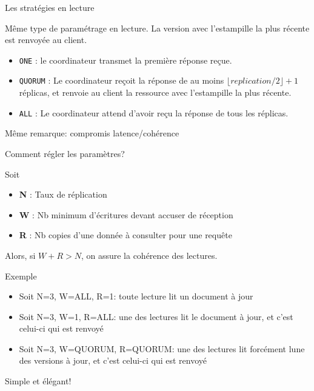  
\begin{frame}[fragile]{Les stratégies en lecture}

Même type de paramétrage en lecture. La version avec l'estampille la plus récente est renvoyée au client.

\begin{itemize}
    \item \texttt{ONE} : le coordinateur transmet la première réponse reçue.

    \item \texttt{QUORUM} : Le coordinateur reçoit la réponse de au moins $\lfloor replication/2 \rfloor +1$  
       réplicas, et renvoie au client la ressource avec l'estampille la plus récente.
    
    \item \texttt{ALL} : Le coordinateur attend d'avoir reçu la réponse  de tous les réplicas. 
\end{itemize}

\vfill

Même remarque: compromis latence/cohérence
\end{frame}
 

\begin{frame}[fragile]{Comment régler les paramètres?}

Soit
    \begin{itemize}
        \item \textbf{N} : Taux de réplication
        \item \textbf{W} : Nb minimum d'écritures devant accuser de réception
        \item \textbf{R} : Nb copies d'une donnée à consulter pour une requête
    \end{itemize} 

\alert{Alors, si $ W + R > N$, on assure la cohérence des lectures.}

\vfill

Exemple

\begin{itemize}
    \item Soit N=3, W=ALL, R=1: toute lecture lit un document à jour
    \item Soit N=3, W=1, R=ALL: une des lectures lit le document à jour, et c'est celui-ci qui est renvoyé
    \item Soit N=3, W=QUORUM, R=QUORUM: une des lectures lit forcément lune des versions  à jour, et c'est celui-ci qui est renvoyé
    
\end{itemize}

\vfill

Simple et élégant!

\end{frame}



